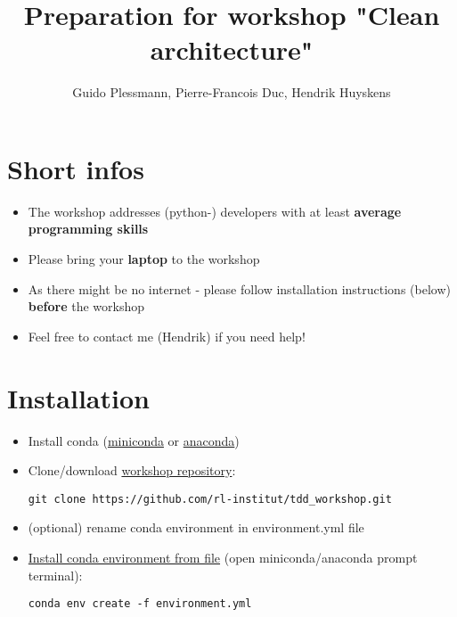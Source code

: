 \documentclass{article}
\title{Preparation for workshop "Clean architecture"}
\author{Guido Plessmann, Pierre-Francois Duc, Hendrik Huyskens}
\begin{document}
\maketitle

\section{Short infos}
\begin{itemize}
\item The workshop addresses (python-) developers with at least \textbf{average programming skills}
\item Please bring your \textbf{laptop} to the workshop
\item As there might be no internet - please follow installation instructions (below) \textbf{before} the workshop
\item Feel free to contact me (Hendrik) if you need help!
\end{itemize}

\section{Installation}

\begin{itemize}
\item Install conda (\href{https://docs.conda.io/en/latest/miniconda.html}{miniconda} or \href{https://www.anaconda.com/distribution/}{anaconda})
\item Clone/download \href{https://github.com/rl-institut/tdd_workshop}{workshop repository}:
\begin{lstlisting}
git clone https://github.com/rl-institut/tdd_workshop.git
\end{lstlisting}
\item (optional) rename conda environment in environment.yml file

\item 
\href{https://docs.conda.io/projects/conda/en/latest/user-guide/tasks/manage-environments.html\#creating-an-environment-from-an-environment-yml-file}{Install conda environment from file} (open miniconda/anaconda prompt terminal):
\begin{lstlisting}
conda env create -f environment.yml
\end{lstlisting}
\end{itemize}
\end{document}
